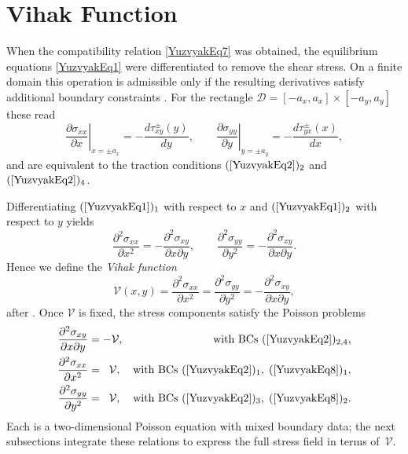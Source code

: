 \section{Vihak Function}

When the compatibility relation \eqref{YuzvyakEq7} was obtained, the
equilibrium equations \eqref{YuzvyakEq1} were differentiated to remove
the shear stress.  On a finite domain this operation is admissible only
if the resulting derivatives satisfy additional boundary constraints
\cite{Yuzvyak16,Yuzvyak26}.  For the rectangle
\(\mathcal{D}=[-a_x,a_x] \times [-a_y,a_y]\) these read  
\begin{equation}
	\left.\frac{\partial\sigma_{xx}}{\partial x}\right|_{x=\pm a_x}= -\frac{d\tau_{xy}^{\pm}(y)}{dy},\qquad
	\left.\frac{\partial\sigma_{yy}}{\partial y}\right|_{y=\pm a_y}= -\frac{d\tau_{yx}^{\pm}(x)}{dx},
	\label{YuzvyakEq8}
\end{equation}
and are equivalent to the traction conditions
\((\ref{YuzvyakEq2})_2\) and \((\ref{YuzvyakEq2})_4\).

Differentiating \((\ref{YuzvyakEq1})_1\) with respect to \(x\) and
\((\ref{YuzvyakEq1})_2\) with respect to \(y\) yields
\[
\frac{\partial^{2}\sigma_{xx}}{\partial x^{2}}=-\frac{\partial^{2}\sigma_{xy}}{\partial x \partial y},\qquad
\frac{\partial^{2}\sigma_{yy}}{\partial y^{2}}=-\frac{\partial^{2}\sigma_{xy}}{\partial x \partial y}.
\]
Hence we define the \emph{Vihak function}
\begin{equation}
	\mathcal{V}(x,y)=
	\frac{\partial^{2}\sigma_{xx}}{\partial x^{2}}
	=\frac{\partial^{2}\sigma_{yy}}{\partial y^{2}}
	=-\frac{\partial^{2}\sigma_{xy}}{\partial x \partial y},
	\label{YuzvyakEq9}
\end{equation}
after \cite{Yuzvyak29,Yuzvyak35}.  Once \(\mathcal{V}\) is fixed, the
stress components satisfy the Poisson problems  
\begin{align}
	\frac{\partial^{2}\sigma_{xy}}{\partial x \partial y}&= -\mathcal{V},
	&\text{with BCs }(\ref{YuzvyakEq2})_{2,4},
	\label{YuzvyakEq10}
	\\
	\frac{\partial^{2}\sigma_{xx}}{\partial x^{2}}&=\;\;\mathcal{V},
	&\text{with BCs }(\ref{YuzvyakEq2})_1,\;(\ref{YuzvyakEq8})_1,
	\label{YuzvyakEq11}
	\\
	\frac{\partial^{2}\sigma_{yy}}{\partial y^{2}}&=\;\;\mathcal{V},
	&\text{with BCs }(\ref{YuzvyakEq2})_3,\;(\ref{YuzvyakEq8})_2.
	\label{YuzvyakEq12}
\end{align}
Each is a two-dimensional Poisson equation with mixed boundary data; the
next subsections integrate these relations to express the full stress
field in terms of~\(\mathcal{V}\).

